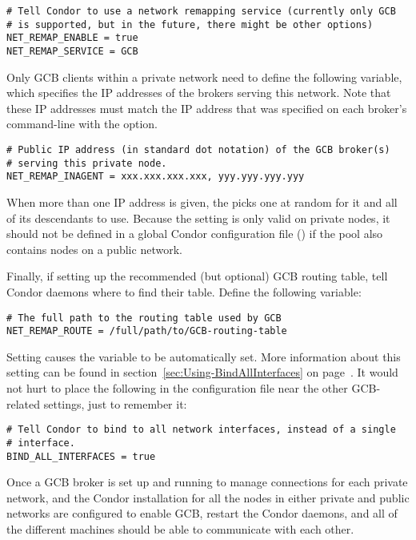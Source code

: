 \footnotesize
\begin{verbatim}
# Tell Condor to use a network remapping service (currently only GCB
# is supported, but in the future, there might be other options)
NET_REMAP_ENABLE = true
NET_REMAP_SERVICE = GCB
\end{verbatim}
\normalsize

Only GCB clients within a private network need to define the following
variable, which specifies the IP addresses of the brokers serving this
network.
Note that these IP addresses must match the IP address
that was specified on each
broker's command-line with the  option.

\footnotesize
\begin{verbatim}
# Public IP address (in standard dot notation) of the GCB broker(s)
# serving this private node.
NET_REMAP_INAGENT = xxx.xxx.xxx.xxx, yyy.yyy.yyy.yyy
\end{verbatim}
\normalsize

When more than one IP address is given, the  picks one at
random for it and all of its descendants to use.
Because the  setting is only
valid on private nodes, it should not be defined in a global
Condor configuration file () if the pool also
contains nodes on a public network.

Finally, if setting up  the recommended (but optional) GCB routing table, 
tell Condor daemons where to find their table.
Define the following variable:

\footnotesize
\begin{verbatim}
# The full path to the routing table used by GCB
NET_REMAP_ROUTE = /full/path/to/GCB-routing-table
\end{verbatim}
\normalsize

Setting  causes the
 variable to be automatically set.
More information about this setting can be found in
section~\ref{sec:Using-BindAllInterfaces} on
page~\pageref{sec:Using-BindAllInterfaces}.
It would not hurt to place the following in the
configuration file near the other GCB-related settings,
just to remember it:

\footnotesize
\begin{verbatim}
# Tell Condor to bind to all network interfaces, instead of a single
# interface.
BIND_ALL_INTERFACES = true
\end{verbatim}
\normalsize

Once a GCB broker is set up and running to manage connections for
each private network, and the Condor installation for all the nodes in
either private and public networks are configured to enable GCB,
restart the Condor daemons, and all of the different machines
should be able to communicate with each other.


